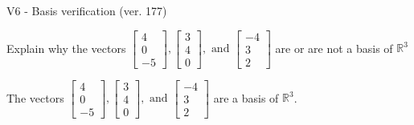 \begin{exercise}
  \begin{exerciseTitle}V6 - Basis verification (ver. 177)\end{exerciseTitle}
  \begin{exerciseStatement}
    Explain why the vectors \(\left[\begin{array}{r}
4 \\
0 \\
-5
\end{array}\right] , \left[\begin{array}{r}
3 \\
4 \\
0
\end{array}\right] , \text{ and } \left[\begin{array}{r}
-4 \\
3 \\
2
\end{array}\right]\) are or are not a basis of \(\mathbb{R}^3\)	


  \end{exerciseStatement}
  \begin{exerciseAnswer}
   The vectors \(\left[\begin{array}{r}
4 \\
0 \\
-5
\end{array}\right] , \left[\begin{array}{r}
3 \\
4 \\
0
\end{array}\right] , \text{ and } \left[\begin{array}{r}
-4 \\
3 \\
2
\end{array}\right]\) 
  	 are  a basis of \(\mathbb{R}^3\).
  


  \end{exerciseAnswer}
\end{exercise}